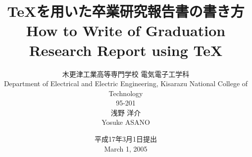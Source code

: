 \documentclass[fleqn]{jreport}%
\title{\bf
  \TeX を用いた卒業研究報告書の書き方 \\
  \normalsize How to Write of Graduation Research Report using \TeX 
  \smallskip
  \large\bf
  }
\date{
  平成17年3月1日提出 \\
  \normalsize March 1, 2005
  }
\author{
  木更津工業高等専門学校 電気電子工学科 \\     
  \normalsize Department of Electrical and Electric Engineering, 
   Kisarazu National College of Technology \\
   \vspace*{5mm}
  95-201 \\
  浅野 洋介\\
  \normalsize Yosuke ASANO
  }
\begin{document}
\maketitle
\maegaki         %

\maetsuke        %
\tableofcontents %
\listoffigures   %
\listoftables    %
\hombun          %




\shaji          %
 
\bunken         %
 
\appendix       %

\end{document}
